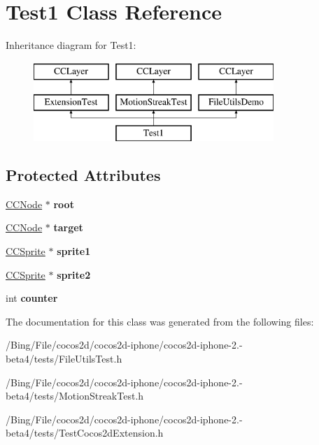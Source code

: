 \hypertarget{interface_test1}{\section{Test1 Class Reference}
\label{interface_test1}
}
Inheritance diagram for Test1\-:\begin{figure}[H]
\begin{center}
\leavevmode
\includegraphics[height=3.000000cm]{interface_test1}
\end{center}
\end{figure}
\subsection*{Protected Attributes}
\begin{DoxyCompactItemize}
\item 
\hypertarget{interface_test1_aff86c403b327cbc32938257636a6bdd3}{\hyperlink{class_c_c_node}{C\-C\-Node} $\ast$ {\bfseries root}}\label{interface_test1_aff86c403b327cbc32938257636a6bdd3}

\item 
\hypertarget{interface_test1_ac40000e8d23181798dab074266493706}{\hyperlink{class_c_c_node}{C\-C\-Node} $\ast$ {\bfseries target}}\label{interface_test1_ac40000e8d23181798dab074266493706}

\item 
\hypertarget{interface_test1_a4aa6b29789bc1bbfd58bda1ab9056bea}{\hyperlink{class_c_c_sprite}{C\-C\-Sprite} $\ast$ {\bfseries sprite1}}\label{interface_test1_a4aa6b29789bc1bbfd58bda1ab9056bea}

\item 
\hypertarget{interface_test1_a4c5391d1155959c5c5ef0c2657f43705}{\hyperlink{class_c_c_sprite}{C\-C\-Sprite} $\ast$ {\bfseries sprite2}}\label{interface_test1_a4c5391d1155959c5c5ef0c2657f43705}

\item 
\hypertarget{interface_test1_a2abf2d0128671d26863094e25e97d2d1}{int {\bfseries counter}}\label{interface_test1_a2abf2d0128671d26863094e25e97d2d1}

\end{DoxyCompactItemize}


The documentation for this class was generated from the following files\-:\begin{DoxyCompactItemize}
\item 
/\-Bing/\-File/cocos2d/cocos2d-\/iphone/cocos2d-\/iphone-\/2.-\/beta4/tests/File\-Utils\-Test.\-h\item 
/\-Bing/\-File/cocos2d/cocos2d-\/iphone/cocos2d-\/iphone-\/2.-\/beta4/tests/Motion\-Streak\-Test.\-h\item 
/\-Bing/\-File/cocos2d/cocos2d-\/iphone/cocos2d-\/iphone-\/2.-\/beta4/tests/Test\-Cocos2d\-Extension.\-h\end{DoxyCompactItemize}
